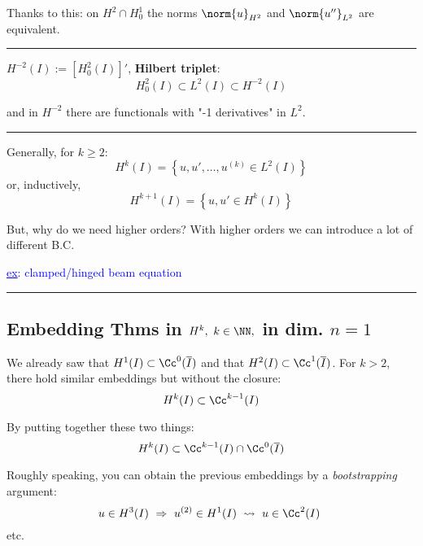Thanks to this: on $H^2\cap H^1_0$ the norms $\norm{u}_{H^2}$ and $\norm{u''}_{L^2}$ are equivalent.

\rule{0.31\textwidth}{0.2pt}
\smallskip

$H^{-2}(I):=\left[ H^2_0(I) \right]'$, \textbf{Hilbert triplet}:
\begin{equation*}
H_0^2(I)\subset L^2(I) \subset H^{-2}(I)
\end{equation*}

and in $H^{-2}$ there are functionals with "-1 derivatives" in $L^2$.

\rule{0.31\textwidth}{0.2pt}
\smallskip

Generally, for $k\geq 2$:
\begin{equation*}
H^k(I)=\left\{ u,u',\dots,u^{(k)}\in L^2(I) \right\}
\end{equation*}
or, inductively,
\begin{equation*}
H^{k+1}(I)=\left\{ u,u'\in H^{k}(I) \right\}
\end{equation*}

But, why do we need higher orders? With higher orders we can introduce a lot of different B.C.

\textcolor{blue}{\underline{ex}: clamped/hinged beam equation}

\rule{0.31\textwidth}{0.2pt}


\subsection{\color{red}Embedding Thms in \texorpdfstring{$H^k,\ k\in\NN,$}{C} in dim. \texorpdfstring{$n=1$}{C}}


We already saw that $H^1(I)\subset \Cc^0(\overline{I})$ and that $H^2(I)\subset \Cc^1(\overline{I})$. For $k>2$, there hold similar embeddings but without the closure:
\begin{equation*}
H^k(I)\subset \Cc^{k-1}(I)
\end{equation*}

By putting together these two things:
\begin{equation*}
H^k(I)\subset \Cc^{k-1}(I)\cap\Cc^0(\overline{I})
\end{equation*}

Roughly speaking, you can obtain the previous embeddings by a \emph{bootstrapping} argument:
\begin{equation*}
u\in H^3(I)\ \Rightarrow \ u^{(2)}\in H^1(I) \ \leadsto \ u\in\Cc^2(I)\ 
\end{equation*}
etc.

